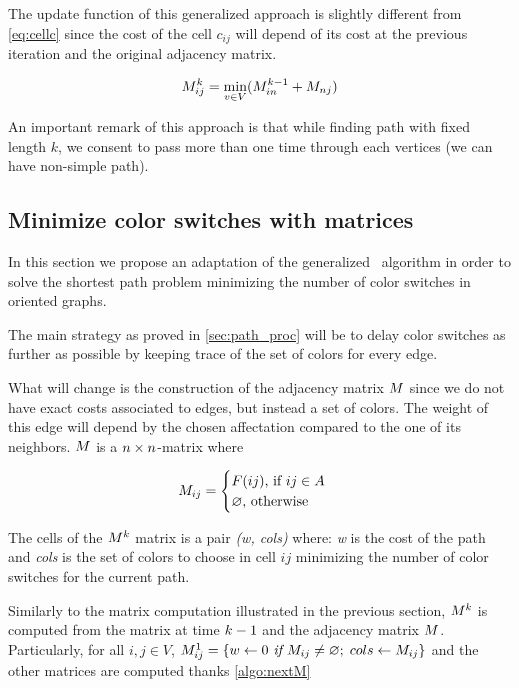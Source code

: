 The update function of this generalized approach is slightly different from \cref{eq:cellc} since the cost of the cell $c_{ij}$ will depend of its cost at the previous iteration and the original adjacency matrix.

\begin{equation}
  M^k_{ij} = \min_{v \in V} (M^{k-1}_{in} + M_{nj})
\end{equation}

An important remark of this approach is that while finding path with fixed length $k$, we consent to pass more than one time through each vertices (\ie we can have non-simple path).

\subsection{Minimize color switches with matrices}
\label{sec:algo_matrix}

In this section we propose an adaptation of the generalized \FW\ algorithm in order to solve the shortest path problem minimizing the number of color switches in oriented graphs.

The main strategy as proved in \cref{sec:path_proc} will be to delay color switches as further as possible by keeping trace of the set of colors for every edge.

What will change is the construction of the adjacency matrix $M$ since we do not have exact costs associated to edges, but instead a set of colors. The weight of this edge will depend by the chosen affectation compared to the one of its neighbors. $M$ is a $n \times n$-matrix where

\begin{equation}
  M_{ij} = \begin{cases}
    F(ij) \text{, if } ij \in A \\
    \varnothing \text{, otherwise}
  \end{cases}
\end{equation}

The cells of the $M^k$ matrix is a pair \textit{(w, cols)} where: \textit{w} is the cost of the path and \textit{cols} is the set of colors to choose in cell $ij$ minimizing the number of color switches for the current path.

Similarly to the matrix computation illustrated in the previous section, $M^k$ is computed from the matrix at time $k-1$ and the adjacency matrix $M$. Particularly, for all $i, j \in V$, $M^1_{ij} = \{w \gets 0 \textit{ if } M_{ij} \neq \varnothing;\; cols \gets M_{ij}\}$ and the other matrices are computed thanks \cref{algo:nextM}

